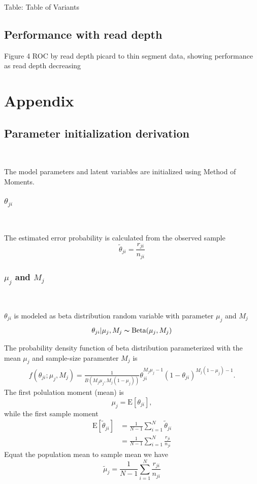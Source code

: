 \documentclass[11pt,reqno]{amsart}
\begin{document}
Table: Table of Variants
\subsection{Performance with read depth}
Figure 4 ROC by read depth
picard to thin segment data, showing performance as read depth decreasing

\section{Appendix}
\subsection{Parameter initialization derivation}\

The model parameters and latent variables are initialized using Method of Moments.
\subsubsection{$\theta_{ji}$}\

The estimated error probability is calculated from the observed sample
\begin{equation}
 \tilde{\theta}_{ji}=\frac{r_{ji}}{n_{ji}}
\end{equation}

\subsubsection{$\mu_j$ and $M_j$}\

$\theta_{ji}$ is modeled as beta distribution random variable with parameter $\mu_j$ and $M_j$
\begin{align}
 \theta_{ji}|\mu_j,M_j\thicksim \text{Beta}(\mu_j,M_j)
\end{align}

The probability density function of beta distribution parameterized with the mean $\mu_j$ and sample-size paramenter $M_j$ is
\begin{equation}
\begin{split}
  f(\theta_{ji};\mu_j,M_j) = \frac{1}{B(M_j\mu_j,M_j(1-\mu_j))}\theta_{ji}^{M_j\mu_j-1}(1-\theta_{ji})^{M_j(1-\mu_j)-1}.
\end{split}
\end{equation}
The first polulation moment (mean) is
\begin{equation}
 \mu_j=\text{E}[\theta_{ji}],
\end{equation}
while the first sample moment
\begin{equation}
\begin{split}
 \text{E}[\tilde{\theta}_{ji}] &= \frac{1}{N-1}\sum_{i=1}^N\tilde{\theta}_{ji}\\ &=\frac{1}{N-1}\sum_{i=1}^N\frac{r_{ji}}{n_{ji}}
\end{split}
\end{equation}
Equat the population mean to sample mean we have
\begin{equation}
 \tilde{\mu}_j =\frac{1}{N-1}\sum_{i=1}^N\frac{r_{ji}}{n_{ji}}
\end{equation}
\end{document}
